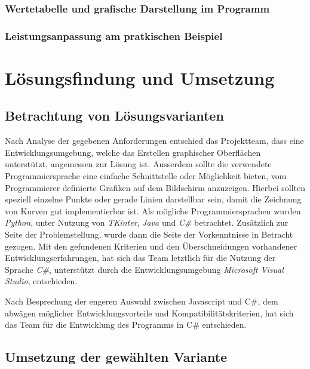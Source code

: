 \documentclass{article}
\begin{document}
    \subsubsection{Wertetabelle und grafische Darstellung im Programm}

    \subsubsection{Leistungsanpassung am pratkischen Beispiel}

\newpage
\section{Lösungsfindung und Umsetzung}

\subsection{Betrachtung von Lösungsvarianten}

    Nach Analyse der gegebenen Anforderungen entschied das Projektteam, dass eine Entwicklungsumgebung, welche das Erstellen graphischer Oberflächen unterstützt, angemessen zur Lösung ist. Ausserdem sollte die verwendete Programmiersprache eine einfache Schnittstelle oder Möglichkeit bieten, vom Programmierer definierte Grafiken auf dem Bildschirm anzuzeigen. Hierbei sollten speziell einzelne Punkte oder gerade Linien darstellbar sein, damit die Zeichnung von Kurven gut implementierbar ist.
    Als mögliche Programmiersprachen wurden \textit{\glqq Python\grqq{}}, unter Nutzung von \textit{\glqq TKinter\grqq{}}, \textit{\glqq Java\grqq{}}    und \textit{\glqq C\#\grqq{}} betrachtet.
    Zusätzlich zur Seite der Problemstellung, wurde dann die Seite der Vorkenntnisse in Betracht gezogen. Mit den gefundenen Kriterien und den Überschneidungen vorhandener Entwicklungserfahrungen, hat sich das Team letztlich für die Nutzung der Sprache \textit{\glqq C\#\grqq{}}, unterstützt durch die Entwicklungsumgebung \textit{\glqq Microsoft Visual Studio\grqq{}}, entschieden.

    Nach Besprechung der engeren Auswahl zwischen Javascript und C\#, dem abwägen möglicher Entwicklungsvorteile und Kompatibilitätskriterien, hat sich das Team für die Entwicklung des Programms in C\# entschieden.

\subsection{Umsetzung der gewählten Variante}
\end{document}
